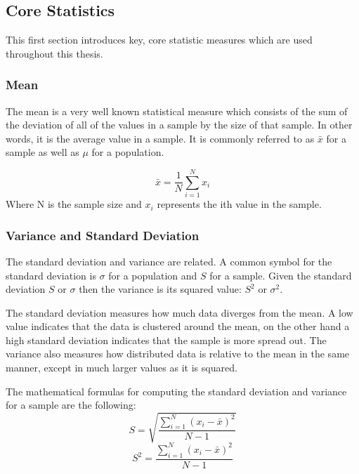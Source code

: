 \subsection{Core Statistics}

This first section introduces key, core statistic measures which are used throughout this thesis.

\subsubsection{Mean}

The mean is a very well known statistical measure which consists of the sum of the deviation of all of the values in a sample by the size of that sample. In other words, it is the average value in a sample. It is commonly referred to as $\bar{x}$ for a sample as well as $\mu$ for a population.

\begin{equation}
    \bar{x} = \frac{1}{N}\sum^{N}_{i=1} x_{i}
\end{equation}
Where N is the sample size and $x_{i}$ represents the ith value in the sample.

\subsubsection{Variance and Standard Deviation}

The standard deviation and variance are related. A common symbol for the standard deviation is $\sigma$ for a population and $S$ for a sample. Given the standard deviation $S$ or $\sigma$ then the variance is its squared value: $S^{2}$ or $\sigma^{2}$.

The standard deviation measures how much data diverges from the mean. A low value indicates that the data is clustered around the mean, on the other hand a high standard deviation indicates that the sample is more spread out. The variance also measures how distributed data is relative to the mean in the same manner, except in much larger values as it is squared.

The mathematical formulas for computing the standard deviation and variance for a sample are the following:
\begin{equation}
    S = \sqrt{\frac{\sum_{i=1}^{N}(x_{i} - \bar{x})^{2}}{N - 1}}
\end{equation}
\begin{equation}
    S^2 = \frac{\sum_{i=1}^{N}(x_{i} - \bar{x})^{2}}{N - 1}
\end{equation}

